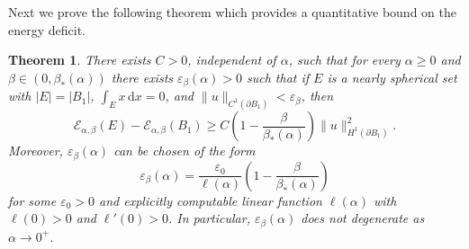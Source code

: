 \documentclass[a4paper,11pt,reqno]{amsart}
\numberwithin{equation}{section}
\newtheorem{theorem}{Theorem}[section]
\theoremstyle{remark}
\theoremstyle{definition}
\let\epsilon\varepsilon
\newcommand{\dd}{\,\mathrm{d}}
\newcommand{\ene}{\mathcal{E}_{\alpha,\beta}}
\renewcommand{\geq}{\geqslant}
\begin{document}
Next we prove the following theorem which provides a quantitative bound on the energy deficit.
	\begin{theorem}\label{thm: Quantitative Deficit}
		There exists $C>0$, independent of $\alpha$, such that for every $\alpha\geq 0$ and $\beta \in (0, \beta_*(\alpha))$ there exists $\epsilon_{\beta}(\alpha)>0$ such that if $E$ is a nearly spherical set with $|E|=|B_1|$, $\int_{E}x \dd x=0$, and $\|u\|_{C^1(\partial B_1)}< \epsilon_{\beta}$, then
		\[
			\ene(E)-\ene(B_1)\geq C\left(1-\frac{\beta}{\beta_*(\alpha)}\right)\|u\|_{H^1(\partial B_1)}^2.
		\]
Moreover, $\epsilon_{\beta}(\alpha)$ can be chosen of the form
\[\epsilon_{\beta}(\alpha) = \frac{\epsilon_0}{\ell(\alpha)}\left(1-\frac{\beta}{\beta_*(\alpha)}\right)\]
for some $\epsilon_0>0$ and explicitly computable linear function $\ell(\alpha)$ with $\ell(0)>0$ and $\ell'(0)>0$. In particular, $\epsilon_{\beta}(\alpha)$ does not degenerate as $\alpha\to 0^+$. 
	\end{theorem}
	
\end{document}
